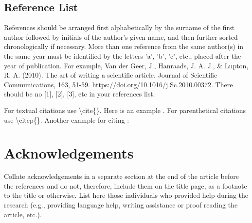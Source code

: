\documentclass[review]{elsarticle}
\begin{document}
\subsection{Reference List}
References should be arranged first alphabetically by the surname of the first author followed by initials of the author's given name, and then further sorted chronologically if necessary. More than one reference from the same author(s) in the same year must be identified by the letters 'a', 'b', 'c', etc., placed after the year of publication. For example, Van der Geer, J., Hanraads, J. A. J., \& Lupton, R. A. (2010). The art of writing a scientific article. Journal of Scientific Communications, 163, 51-59. https://doi.org/10.1016/j.Sc.2010.00372. There should be no [1], [2], [3], etc in your references list.


For textual citations use \textbackslash cite\{\}. Here is an example \cite{Feynman1963118,Dirac1953888}. For parenthetical citations use \textbackslash citep\{\}. Another example for citing \citep{Smith2012qr,Smith2013jd,art}: 


\section*{Acknowledgements}
Collate acknowledgements in a separate section at the end of the article before the references and do not, therefore, include them on the title page, as a footnote to the title or otherwise. List here those individuals who provided help during the research (e.g., providing language help, writing assistance or proof reading the article, etc.).



\end{document}
